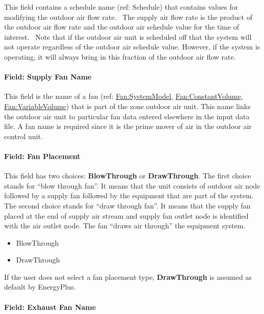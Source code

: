 This field contains a schedule name (ref: Schedule) that contains values for modifying the outdoor air flow rate.~ The supply air flow rate is the product of the outdoor air flow rate and the outdoor air schedule value for the time of interest. ~Note that if the outdoor air unit is scheduled off that the system will not operate regardless of the outdoor air schedule value. However, if the system is operating, it will always bring in this fraction of the outdoor air flow rate.

\paragraph{Field: Supply Fan Name}\label{field-supply-fan-name-000}

This field is the name of a fan (ref: \hyperref[fansystemmodel]{Fan:SystemModel}, \hyperref[fanconstantvolume]{Fan:ConstantVolume}, \hyperref[fanvariablevolume]{Fan:VariableVolume}) that is part of the zone outdoor air unit. This name links the outdoor air unit to particular fan data entered elsewhere in the input data file. A fan name is required since it is the prime mover of air in the outdoor air control unit.

\paragraph{Field: Fan Placement}\label{field-fan-placement-1-001}

This field has two choices: \textbf{BlowThrough} or \textbf{DrawThrough}. The first choice stands for ``blow through fan''. It means that the unit consists of outdoor air node followed by a supply fan followed by the equipment that are part of the system. The second choice stands for ``draw through fan''. It means that the supply fan placed at the end of supply air stream and supply fan outlet node is identified with the air outlet node. The fan ``draws air through'' the equipment system.

\begin{itemize}
\item
  BlowThrough
\item
  DrawThrough
\end{itemize}

If the user does not select a fan placement type, \textbf{DrawThrough} is assumed as default by EnergyPlus.

\paragraph{Field: Exhaust Fan Name}\label{field-exhaust-fan-name}


